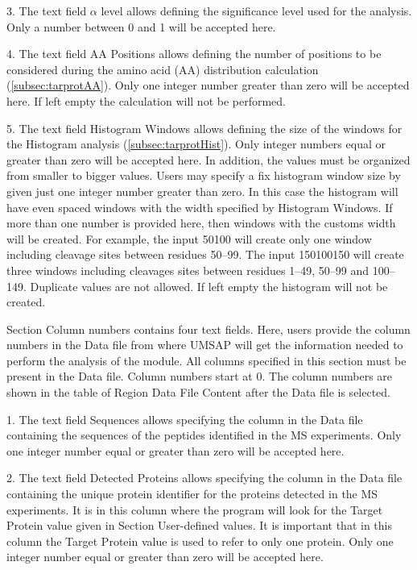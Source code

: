 \num{3}. The text field $\alpha$ level allows defining the significance level
used for the analysis. Only a number between \num{0} and \num{1} will be accepted
here.

\num{4}. The text field AA Positions\label{par:tarprotPos} allows defining
the number of positions to be considered during the amino acid (AA) distribution
calculation (\autoref{subsec:tarprotAA}). Only one integer number greater than zero
will be accepted here. If left empty the calculation will not be performed.

\num{5}. The text field Histogram Windows\label{par:tarprotHist} allows
defining the size of the windows for the Histogram analysis (\autoref{subsec:tarprotHist}).
Only integer numbers equal or greater than zero will be accepted here. In addition,
the values must be organized from smaller to bigger values. Users may specify a fix
histogram window size by given just one integer number greater than zero. In this
case the histogram will have even spaced windows with the width specified by Histogram
Windows. If more than one number is provided here, then windows with the customs width
will be created. For example, the input \numlist{50 100} will create only one window
including cleavage sites between residues \numrange{50}{99}. The input
\numlist{1 50 100 150} will create three windows including cleavages sites between
residues \numrange{1}{49}, \numrange{50}{99} and \numrange{100}{149}. Duplicate values
are not allowed. If left empty the histogram will not be created.

Section Column numbers contains four text fields. Here, users provide the column
numbers in the Data file from where UMSAP will get the information needed to perform
the analysis of the module. All columns specified in this section must be present
in the Data file. Column numbers start at \num{0}. The column numbers are shown in
the table of Region Data File Content after the Data file is selected.

\num{1}. The text field Sequences allows specifying the column in the Data
file containing the sequences of the peptides identified in the MS experiments.
Only one integer number equal or greater than zero will be accepted here.

\num{2}. The text field Detected Proteins allows specifying the column in
the Data file containing the unique protein identifier for the proteins detected
in the MS experiments. It is in this column where the program will look for the
Target Protein value given in Section User-defined values. It is important that
in this column the Target Protein value is used to refer to only one protein. Only
one integer number equal or greater than zero will be accepted here.

